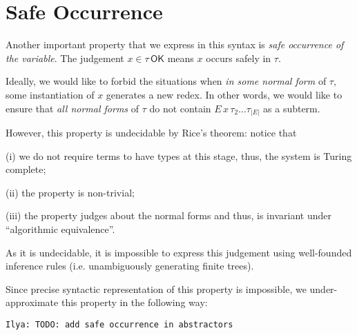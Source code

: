 \documentclass[a4,natbib=false]{article}
\newcommand{\ilyam}[1]{{\color{red} \texttt{Ilya:  #1}}}
\newcommand{\bnfalt}{\;\;|\;\;}
\newcommand{\comptoval}[1]{\downarrow \hspace{-2pt} #1}
\newcommand{\sigmatype}[2]{\Sigma {#1}.\,#2}
\newcommand{\eqtype}[3]{\mathsf{eq}{#1}\,{#2}\,{#3}}
\newcommand{\narg}[1]{|{#1}|}
\newcommand{\judgeSok}[2]{{#1} \in {#2}\,\mathsf{OK}}
\begin{document}



\section{Safe Occurrence}

Another important property that we express in this syntax is \emph{safe
  occurrence of the variable}. The judgement $\judgeSok{x}{\tau}$ means $x$
occurs safely in $\tau$.

Ideally, we would like to forbid the situations when \emph{in some normal form}
of $\tau$, some instantiation of $x$ generates a new redex. In other words, we
would like to ensure that
\emph{all normal forms} of $\tau$ do not contain $E \, x \, \tau_2 \dots
\tau_{\narg{E}}$ as a subterm.

However, this property is undecidable by Rice's theorem: notice that
\begin{enumerate*}

\item[(i)] we do not require terms to have types at this stage, thus, the
  system is Turing complete;

\item[(ii)] the property is non-trivial;

\item[(iii)] the property judges about the normal forms and thus, is invariant
  under ``algorithmic equivalence''.
\end{enumerate*}
As it is undecidable, it is impossible to express this judgement using
well-founded inference rules (i.e. unambiguously generating finite trees).

Since precise syntactic representation of this property is impossible, we
under-approximate this property in the following way:

\ilyam{TODO: add safe occurrence in abstractors}
\end{document}
